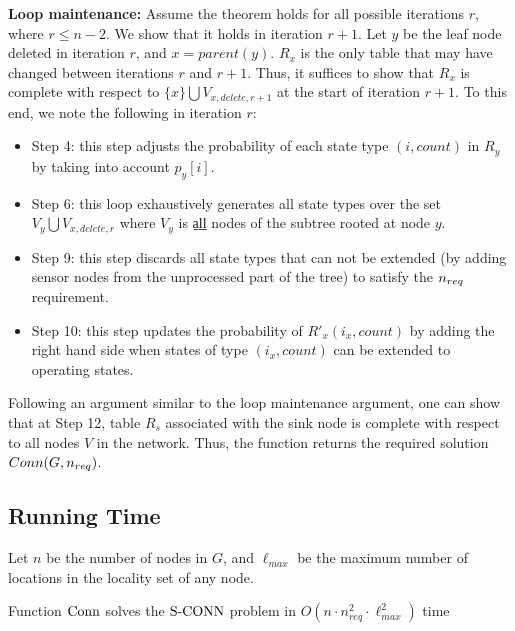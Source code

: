 \nwline
{\bf Loop maintenance:}
Assume the theorem holds for all possible iterations $r$, where $r \leq n-2$.
We show that it holds in iteration $r+1$.
%
Let $y$ be the leaf node deleted in iteration $r$, and $x= parent(y)$.
$R_x$ is the only table that may have changed between iterations
$r$ and $r+1$.
%
Thus, it suffices to show that $R_x$ is complete with respect to
$\{ x \} \bigcup V_{x,delete,r+1}$ at the start of iteration $r+1$.
%
To this end, we note the following in iteration $r$:
%
\begin{itemize}
\item  Step 4: this step adjusts the probability of each state type
       $(i,count)$ in $R_y$ by taking into account $p_y[i]$.
\item  Step 6: this loop exhaustively generates all state types over the
       set $V_y \bigcup V_{x,delete,r}$ where $V_y$ is a̠l̠l̠ nodes of
       the subtree rooted at node $y$.
\item  Step 9: this step discards all state types that can not be extended
       (by adding sensor nodes from the unprocessed part of the tree)
       to satisfy the ${n_{req}}$ requirement.
\item  Step 10: this step updates the probability of $R'_x(i_x,count)$ by
       adding the right hand side when states of type $(i_x, count)$
       can be extended to operating states.
\end{itemize}
\IEEEQED

Following an argument similar to the loop maintenance argument, one can
show that at Step 12, table $R_s$ associated with the sink node is
complete with respect to all nodes $V$ in the network.
%
Thus, the function returns the required solution $Conn(G, {n_{req}})$.


\subsection{Running Time}

Let $n$ be the number of nodes in $G$, and $\ell_{max}$ be the maximum
number of locations in the locality set of any node.

\begin{thm}
    Function ${\mathrm {Conn}}$ solves the ${\mathrm {S\mbox{-}CONN}}$ problem in
    $O(n \cdot n_{req}^2  \cdot \ell_{max}^2)$ time
\end{thm}

